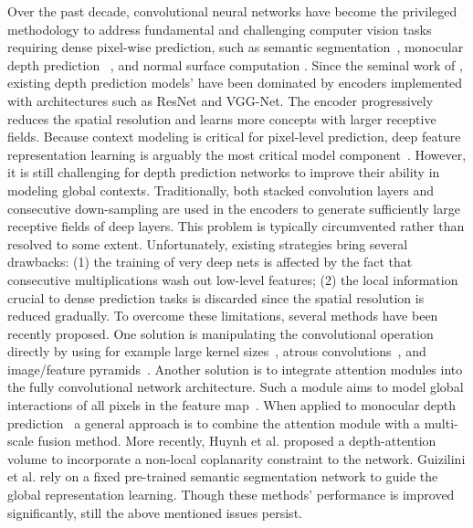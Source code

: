 \documentclass[10pt,twocolumn,letterpaper]{article}
\begin{document}
Over the past decade, convolutional neural networks have become the privileged methodology to address fundamental and challenging computer vision tasks requiring dense pixel-wise prediction, such as semantic segmentation~\cite{chen2016attention,fu2019dual}, monocular depth prediction ~\cite{liu2015deep,eigen2014depth}, and normal surface computation \cite{qi2018geonet}.
Since the seminal work of \cite{he2016deep},
existing depth prediction models' have been dominated by encoders implemented with architectures such as ResNet and VGG-Net. The encoder progressively reduces the spatial resolution and learns more concepts with larger receptive fields. Because context modeling is critical for pixel-level prediction, deep feature representation learning is arguably the most critical model component~\cite{chen2017deeplab}. However, it is still challenging for depth prediction networks to improve their ability in modeling global contexts. Traditionally, both stacked convolution layers and consecutive down-sampling are used in the encoders to generate sufficiently large receptive fields of deep layers. This problem is typically circumvented rather than resolved to some extent. Unfortunately, existing strategies bring several drawbacks: (1) the training of very deep nets is affected by the fact that consecutive multiplications wash out low-level features; (2) the local information crucial to dense prediction tasks is discarded since the spatial resolution is reduced gradually. To overcome these limitations, several methods have been recently proposed. One solution is manipulating the convolutional operation directly by using for example large kernel sizes~\cite{peng2017large}, atrous convolutions~\cite{chen2017deeplab}, and image/feature pyramids~\cite{zhao2017pyramid}. Another solution is to integrate attention modules into the fully convolutional network architecture. Such a module aims to model global interactions of all pixels in the feature map~\cite{wang2018non}. When applied to monocular depth prediction~\cite{xu2018pad,xu2020probabilistic} a general approach is to combine the attention module with a multi-scale fusion method.
More recently, Huynh et al. \cite{huynh2020guiding} proposed a depth-attention volume to incorporate a non-local coplanarity constraint to the network.
Guizilini et al. \cite{guizilini2020semantically} rely on a fixed pre-trained semantic segmentation network to guide the global representation learning. Though these methods' performance is improved significantly, still the above mentioned issues persist. 
\end{document}
